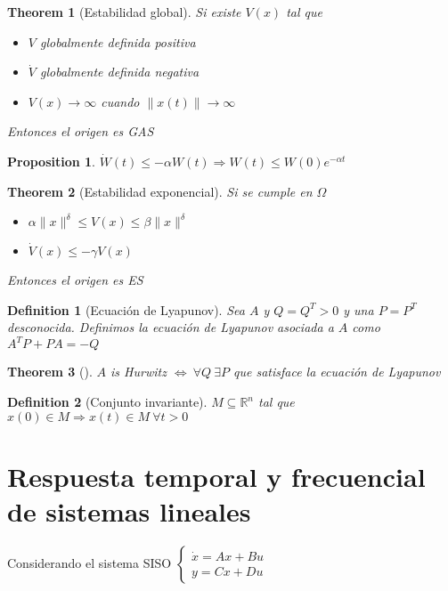 \documentclass[leqno]{article}
\newtheorem*{theorem}{Theorem}
\newtheorem*{proposition}{Proposition}
\newtheorem*{definition}{Definition}
\begin{document}
\begin{theorem}[Estabilidad global] Si existe $V(x)$ tal que  
  \begin{itemize}[topsep=-6pt, itemsep=0pt]
    \item $V$ globalmente definida positiva
	\item  $\dot{V}$ globalmente definida negativa
	\item $V(x) \to \infty$ cuando $\|x(t)\|\to \infty$
  \end{itemize}
  Entonces el origen es GAS
\end{theorem}

\begin{proposition}
 $\dot{W}(t)\le -\alpha W(t) \Rightarrow W(t)\le W(0)e^{-\alpha t}$ 
\end{proposition}

\begin{theorem}[Estabilidad exponencial]Si se cumple en $\Omega $
  \begin{itemize}[topsep=-6pt, itemsep=0pt]
    \item $\alpha \|x\|^\delta\le V(x)\le \beta \|x\|^\delta$ 
	\item $\dot{V}(x)\le -\gamma V(x)$
  \end{itemize}
  Entonces el origen es ES
\end{theorem}

\begin{definition}[Ecuación de Lyapunov] Sea $A$ y  $Q = Q^T>0$ y una  $P=P^T$ desconocida. Definimos la ecuación de Lyapunov asociada a  $A$ como $A^TP+PA = -Q$
\end{definition}

\begin{theorem}[] $A$ is Hurwitz $\iff \ \forall Q \ \exists P$ que satisface la ecuación de Lyapunov
\end{theorem}

\begin{definition}[Conjunto invariante] $M\subseteq \mathbb{R}^n$ tal que $x(0)\in M \Rightarrow x(t)\in M \ \forall t>0$

\end{definition}

\section{Respuesta temporal y frecuencial de sistemas lineales}
Considerando el sistema SISO $\displaystyle \begin{cases}
  \dot{x} = Ax + Bu \\
  y = Cx+Du
\end{cases}$
\end{document}
